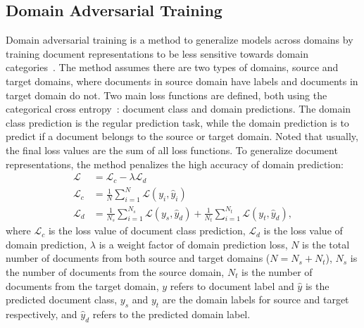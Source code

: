 
\subsection{Domain Adversarial Training}

Domain adversarial training is a method to generalize models across domains by training document representations to be less sensitive towards domain categories~\cite{ganin2016domain}.
The method assumes there are two types of domains, source and target domains, where documents in source domain have labels and documents in target domain do not.
Two main loss functions are defined, both using the categorical cross entropy~\cite{goodfellow2016deep}: document class and domain predictions.
The domain class prediction is the regular prediction task, while the domain prediction is to predict if a document belongs to the source or target domain.
Noted that usually, the final loss values are the sum of all loss functions. 
To generalize document representations, the method penalizes the high accuracy of domain prediction:
\begin{align}
\label{chap2:dat_loss}
    \mathcal{L} &= \mathcal{L}_c - \lambda\mathcal{L}_d \\
    \mathcal{L}_c &= \frac{1}{N}\sum_{i=1}^N\mathcal{L}(y_i, \hat{y}_i) \\ 
    \mathcal{L}_d &= \frac{1}{N_s}\sum_{i=1}^{N_s}\mathcal{L}(y_s, \hat{y}_d) + \frac{1}{N_t}\sum_{i=1}^{N_t}\mathcal{L}(y_t, \hat{y}_d), 
\end{align}
where $\mathcal{L}_c$ is the loss value of document class prediction, $\mathcal{L}_d$ is the loss value of domain prediction, $\lambda$ is a weight factor of domain prediction loss, $N$ is the total number of documents from both source and target domains ($N = N_s + N_t$), $N_s$ is the number of documents from the source domain, $N_t$ is the number of documents from the target domain, $y$ refers to document label and $\hat{y}$ is the predicted document class, $y_s$ and $y_t$ are the domain labels for source and target respectively, and $\hat{y}_d$ refers to the predicted domain label.

